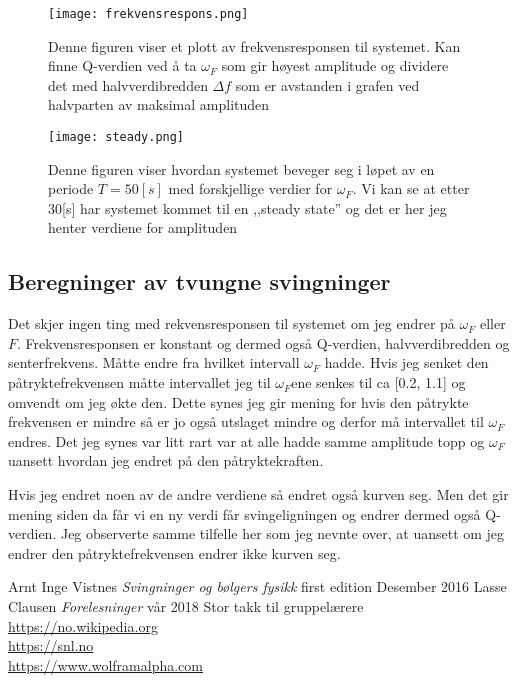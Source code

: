 \documentclass[a4paper,12pt,norsk]{article}
\begin{document}
\begin{enumerate}[label=(\alph*)]
\begin{figure}[h!]
\begin{minipage}[b]{\linewidth}
\texttt{[image: frekvensrespons.png]} 
\caption[Frekvensrespons]{Denne figuren viser et plott av frekvensresponsen til systemet. Kan finne Q-verdien ved å ta $\omega_F$ som gir høyest amplitude og dividere det med halvverdibredden $\Delta f$ som er avstanden i grafen ved halvparten av maksimal amplituden}
\label{frekvensrespons}
\end{minipage}
\begin{minipage}[b]{\linewidth}
\texttt{[image: steady.png]} 
\caption[Steady state]{Denne figuren viser hvordan systemet beveger seg i løpet av en periode $T = 50 [s]$ med forskjellige verdier for $\omega_F$. Vi kan se at etter 30[s] har systemet kommet til en ,,steady state'' og det er her jeg henter verdiene for amplituden}
\label{steady}
\end{minipage}
\end{figure}

\end{enumerate}

\subsection{Beregninger av tvungne svingninger}
Det skjer ingen ting med rekvensresponsen til systemet om jeg endrer på $\omega_F$ eller $F$. Frekvensresponsen er konstant og dermed også Q-verdien, halvverdibredden og senterfrekvens. Måtte endre fra hvilket intervall $\omega_F$ hadde. Hvis jeg senket den påtryktefrekvensen måtte intervallet jeg til $\omega_F$ene senkes til ca [0.2, 1.1] og omvendt om jeg økte den. Dette synes jeg gir mening for hvis den påtrykte frekvensen er mindre så er jo også utslaget mindre og derfor må intervallet til $\omega_F$ endres. Det jeg synes var litt rart var at alle hadde samme amplitude topp og $\omega_F$ uansett hvordan jeg endret på den påtryktekraften. 

Hvis jeg endret noen av de andre verdiene så endret også kurven seg. Men det gir mening siden da får vi en ny verdi får svingeligningen og endrer dermed også Q-verdien. Jeg observerte samme tilfelle her som jeg nevnte over, at uansett om jeg endrer den påtryktefrekvensen endrer ikke kurven seg.

\newpage

\begin{thebibliography}{}
	Arnt Inge Vistnes
	\textit{Svingninger og bølgers fysikk}
	first edition
	Desember 2016
	Lasse Clausen
	\textit{Forelesninger}
	vår 2018
	Stor takk til gruppelærere
	\url{https://no.wikipedia.org}\\
	\url{https://snl.no}\\
	\url{https://www.wolframalpha.com}
\end{thebibliography}
\end{document}
